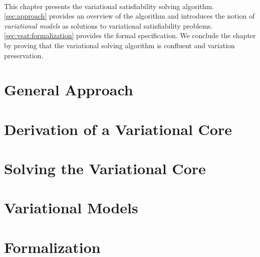 ~\label{chapter:vsat}

This chapter presents the variational satisfiability solving algorithm.
\autoref{sec:approach} provides an overview of the algorithm and introduces the
notion of \emph{variational models} as solutions to variational satisfiability
problems. \autoref{sec:vsat:formalization} provides the formal specification.
We conclude the
chapter by proving that the variational solving algorithm is confluent and
variation preservation.


\section{General Approach}


\section{Derivation of a Variational Core}


\section{Solving the Variational Core}


\section{Variational Models}


\section{Formalization}


